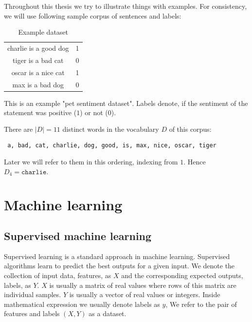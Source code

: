     \* %
    \* %
    
    Throughout this thesis we try to illustrate things with examples. 
    For consistency, we will use following sample corpus of sentences and labels:
    
    \begin{table}[h]
        \centering
        \begin{tabular}{c|c}
        \hline
            charlie is a good dog & 1 \\
            tiger is a bad cat & 0 \\
            oscar is a nice cat & 1 \\
            max is a bad dog & 0 \\
        \end{tabular}
        \caption{Example dataset}
        \label{tab:example:dataset}

    \end{table}
    
    This is an example "pet sentiment dataset". Labels denote, if the sentiment of the statement was positive ($1$) or not ($0$). 

    There are $|D|=11$ distinct words in the vocabulary $D$ of this corpus: 
    \begin{verbatim} a, bad, cat, charlie, dog, good, is, max, nice, oscar, tiger \end{verbatim}
    
    Later we will refer to them in this ordering, indexing from $1$. 
    Hence $D_4=\mathtt{charlie}$.


\section{Machine learning}
    \* %
    \* %
    
    \subsection{Supervised machine learning}
    
    Supervised learning is a standard approach in machine learning. 
    Supervised algorithms learn to predict the best outputs for a given input.
    We denote the collection of input data, features, as $X$ and the corresponding expected outputs, labels, as $Y$.
    $X$ is usually a matrix of real values where rows of this matrix are individual samples.
    $Y$ is usually a vector of real values or integers. 
    Inside mathematical expression we usually denote labels as $y$,
    We refer to the pair of features and labels $(X, Y)$ as a dataset.
    
